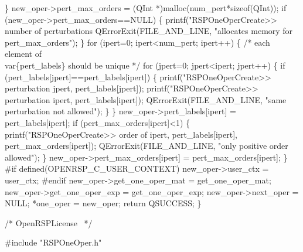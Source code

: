     \}
    new_oper->pert_max_orders = (QInt *)malloc(num_pert*sizeof(QInt));
    if (new_oper->pert_max_orders==NULL) \{
        printf("RSPOneOperCreate>> number of perturbations %
        QErrorExit(FILE_AND_LINE, "allocates memory for pert_max_orders");
    \}
    for (ipert=0; ipert<num_pert; ipert++) \{
        /* each element of \\var\{pert_labels\} should be unique */
        for (jpert=0; jpert<ipert; jpert++) \{
            if (pert_labels[jpert]==pert_labels[ipert]) \{
                printf("RSPOneOperCreate>> perturbation %
                       jpert,
                       pert_labels[jpert]);
                printf("RSPOneOperCreate>> perturbation %
                       ipert,
                       pert_labels[ipert]);
                QErrorExit(FILE_AND_LINE, "same perturbation not allowed");
            \}
        \}
        new_oper->pert_labels[ipert] = pert_labels[ipert];
        if (pert_max_orders[ipert]<1) \{
            printf("RSPOneOperCreate>> order of %
                   ipert,
                   pert_labels[ipert],
                   pert_max_orders[ipert]);
            QErrorExit(FILE_AND_LINE, "only positive order allowed");
        \}
        new_oper->pert_max_orders[ipert] = pert_max_orders[ipert];
    \}
#if defined(OPENRSP_C_USER_CONTEXT)
    new_oper->user_ctx = user_ctx;
#endif
    new_oper->get_one_oper_mat = get_one_oper_mat;
    new_oper->get_one_oper_exp = get_one_oper_exp;
    new_oper->next_oper = NULL;
    *one_oper = new_oper;
    return QSUCCESS;
\}

\nwendcode{}\endmoddef
/*
  \LA{}OpenRSPLicense~{\nwtagstyle{}}\RA{}
*/

#include "RSPOneOper.h"


